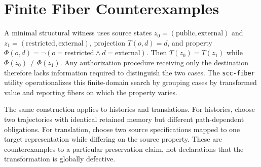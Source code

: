\section{Finite Fiber Counterexamples}
A minimal structural witness uses source states $z_0=(\mathrm{public},\mathrm{external})$ and $z_1=(\mathrm{restricted},\mathrm{external})$, projection $T(o,d)=d$, and property $\Phi(o,d)=\neg(o=\mathrm{restricted}\wedge d=\mathrm{external})$. Then $T(z_0)=T(z_1)$ while $\Phi(z_0)\ne\Phi(z_1)$. Any authorization procedure receiving only the destination therefore lacks information required to distinguish the two cases. The \texttt{scc-fiber} utility operationalizes this finite-domain search by grouping cases by transformed value and reporting fibers on which the property varies.

The same construction applies to histories and translations. For histories, choose two trajectories with identical retained memory but different path-dependent obligations. For translation, choose two source specifications mapped to one target representation while differing on the source property. These are counterexamples to a particular preservation claim, not declarations that the transformation is globally defective.